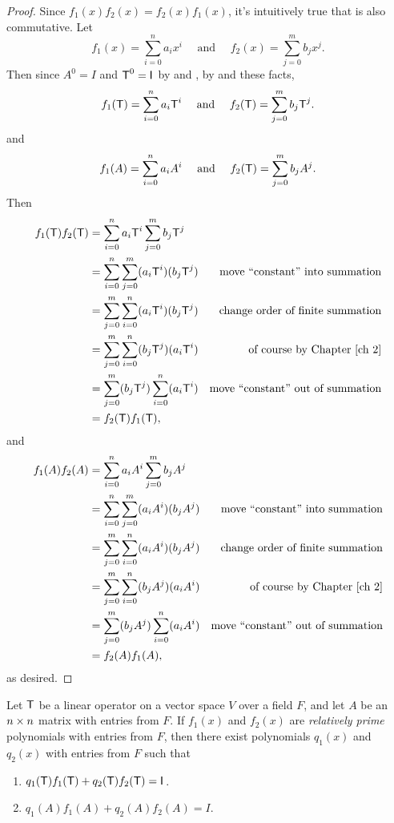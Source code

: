 \begin{proof}
Since \(f_1(x)f_2(x) = f_2(x)f_1(x)\), it's intuitively true that  is also commutative.
Let
\[
    f_1(x) = \sum_{i = 0}^n a_i x^i \quad \text{ and } \quad f_2(x) = \sum_{j = 0}^m b_j x^j.
\]
Then since \(A^0 = I\) and \(\textsf{T}^0 = \textsf{I}_{_{}}\) by  and , by  and these facts,
\[
    f_1(\textsf{T}) = \sum_{i = 0}^n a_i \textsf{T}^i \quad \text{ and } \quad f_2(\textsf{T}) = \sum_{j = 0}^m b_j \textsf{T}^j.
\]
and
\[
    f_1(A) = \sum_{i = 0}^n a_i A^i \quad \text{ and } \quad f_2(\textsf{T}) = \sum_{j = 0}^m b_j A^j.
\]
Then
\begin{align*}
    f_1(\T) f_2(\T) & = \sum_{i = 0}^n a_i \T^i \sum_{j = 0}^m b_j \T^j \\
                    & = \sum_{i = 0}^n \sum_{j = 0}^m (a_i \T^i) (b_j \T^j) & \text{move ``constant'' into summation} \\
                    & = \sum_{j = 0}^m \sum_{i = 0}^n (a_i \T^i) (b_j \T^j) & \text{change order of finite summation} \\
                    & = \sum_{j = 0}^m \sum_{i = 0}^n (b_j \T^j) (a_i \T^i) & \text{of course by \CH{2}} \\
                    & = \sum_{j = 0}^m (b_j \T^j) \sum_{i = 0}^n (a_i \T^i) & \text{move ``constant'' out of summation} \\
                    & = f_2(\T) f_1(\T),
\end{align*}
and
\begin{align*}
    f_1(A) f_2(A) & = \sum_{i = 0}^n a_i A^i \sum_{j = 0}^m b_j A^j \\
                    & = \sum_{i = 0}^n \sum_{j = 0}^m (a_i A^i) (b_j A^j) & \text{move ``constant'' into summation} \\
                    & = \sum_{j = 0}^m \sum_{i = 0}^n (a_i A^i) (b_j A^j) & \text{change order of finite summation} \\
                    & = \sum_{j = 0}^m \sum_{i = 0}^n (b_j A^j) (a_i A^i) & \text{of course by \CH{2}} \\
                    & = \sum_{j = 0}^m (b_j A^j) \sum_{i = 0}^n (a_i A^i) & \text{move ``constant'' out of summation} \\
                    & = f_2(A) f_1(A),
\end{align*}
as desired.
\end{proof}

\begin{appendix theorem} \label{thm e.5}
Let \(\textsf{T}\) be a linear operator on a vector space \(V\) over a field \(F\), and let \(A\) be an \(n \times n\) matrix with entries from \(F\).
If \(f_1(x)\) and \(f_2(x)\) are \emph{relatively prime} polynomials with entries from \(F\), then there exist polynomials \(q_1(x)\) and \(q_2(x)\) with entries from \(F\) such that
\begin{enumerate}
\item \(q_1(\textsf{T})f_1(\textsf{T}) + q_2(\textsf{T})f_2(\textsf{T}) = \textsf{I}_{_{}}\).
\item \(q_1(A)f_1(A) + q_2(A)f_2(A) = I\).
\end{enumerate}
\end{appendix theorem}

